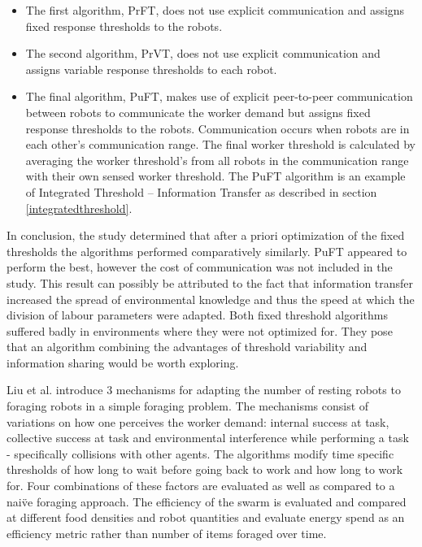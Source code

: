 \begin{itemize}
\item The first algorithm, PrFT, does not use explicit communication and assigns fixed response thresholds to the robots.
\item The second algorithm, PrVT, does not use explicit communication and assigns variable response thresholds to each robot. 
\item The final algorithm, PuFT, makes use of explicit peer-to-peer communication between robots to communicate the worker demand but assigns fixed response thresholds to the robots.  Communication occurs when robots are in each other's communication range. The final worker threshold is calculated by averaging the worker threshold's from all robots in the communication range with their own sensed worker threshold. 
The PuFT algorithm is an example of Integrated Threshold -- Information Transfer as described in section \ref{integratedthreshold}.
\end{itemize}

In conclusion, the study determined that after a priori optimization of the fixed thresholds the algorithms performed comparatively similarly. PuFT appeared to perform the best, however the cost of communication was not included in the study. This result can possibly be attributed to the fact that information transfer increased the spread of environmental knowledge and thus the speed at which the division of labour parameters were adapted. Both fixed threshold algorithms suffered badly in environments where they were not optimized for. They pose that an algorithm combining the advantages of threshold variability and information sharing would be worth exploring. 

Liu et al. \cite{liu2007towards} introduce 3 mechanisms for adapting the number of resting robots to foraging robots in a simple foraging problem. The mechanisms consist of variations on how one perceives the worker demand: internal success at task, collective success at task and environmental interference while performing a task - specifically collisions with other agents. The algorithms modify time specific thresholds of how long to wait before going back to work and how long to work for. Four combinations of these factors are evaluated as well as compared to a nai\"ve foraging approach. The efficiency of the swarm is evaluated and compared at different food densities and robot quantities and evaluate energy spend as an efficiency metric rather than number of items foraged over time. %

